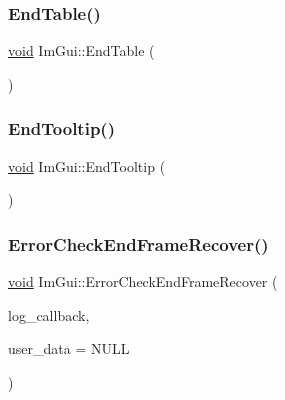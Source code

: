 \mbox{\label{namespaceImGui_a9c70aaa6464c2e51e6f3342da133ada1}} 
\subsubsection{\texorpdfstring{End\+Table()}{EndTable()}}
{\footnotesize\ttfamily \hyperlink{imgui__impl__opengl3__loader_8h_ac668e7cffd9e2e9cfee428b9b2f34fa7}{void} Im\+Gui\+::\+End\+Table (\begin{DoxyParamCaption}{ }\end{DoxyParamCaption})}

\mbox{\label{namespaceImGui_ac8d75c160cfdf43d512f773ca133a1c6}} 
\subsubsection{\texorpdfstring{End\+Tooltip()}{EndTooltip()}}
{\footnotesize\ttfamily \hyperlink{imgui__impl__opengl3__loader_8h_ac668e7cffd9e2e9cfee428b9b2f34fa7}{void} Im\+Gui\+::\+End\+Tooltip (\begin{DoxyParamCaption}{ }\end{DoxyParamCaption})}

\mbox{\label{namespaceImGui_aaeda60ee2c0b5c2b3f397b237c9928f3}} 
\subsubsection{\texorpdfstring{Error\+Check\+End\+Frame\+Recover()}{ErrorCheckEndFrameRecover()}}
{\footnotesize\ttfamily \hyperlink{imgui__impl__opengl3__loader_8h_ac668e7cffd9e2e9cfee428b9b2f34fa7}{void} Im\+Gui\+::\+Error\+Check\+End\+Frame\+Recover (\begin{DoxyParamCaption}\item[{\hyperlink{imgui__internal_8h_af128655e687b027c18655e3bfde4b11e}{Im\+Gui\+Error\+Log\+Callback}}]{log\+\_\+callback,  }\item[{\hyperlink{imgui__impl__opengl3__loader_8h_ac668e7cffd9e2e9cfee428b9b2f34fa7}{void} $\ast$}]{user\+\_\+data = {\ttfamily NULL} }\end{DoxyParamCaption})}

